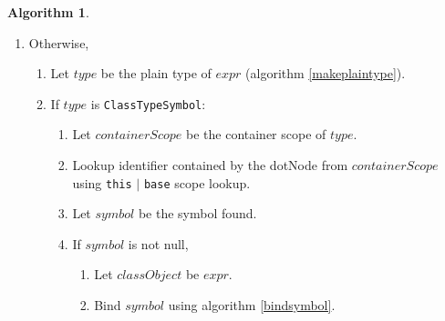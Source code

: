 \documentclass[a4paper,oneside,11pt]{book}
\theoremstyle{definition}
\newtheorem{algo}{Algorithm}[section]
\begin{document}
\begin{algo}
\begin{itemize}
\begin{enumerate}
\begin{enumerate}
\item
Let $containerSymbol$ be null.
\item
If $expr$ is \verb|BoundNamespaceExpression| set $containerSymbol$ to the namespace symbol contained by $expr$.
\item
Otherwise, $expr$ is \verb|BoundTypeExpression|, so
\begin{enumerate}
\item
Let $typeSymbol$ be the type symbol contained by $expr$.
\item
If $typeSymbol$ is \verb|ClassTypeSymbol| or $typeSymbol$ is \verb|EnumTypeSymbol|, set $containerSymbol$ to $typeSymbol$.
\item
Otherwise, report error.
\end{enumerate}
\item
Let $containerScope$ be the container scope of $containerSymbol$.
\item
Lookup identifier contained by the dotNode from $containerScope$ using \verb|this| $|$ \verb|base| scope lookup.
\item
Let $symbol$ be the symbol found.
\item
If $symbol$ is not null,
\begin{enumerate}
\item
Bind $symbol$ using algorithm \ref{bindsymbol}.
\end{enumerate}
\item
Otherwise, report error.
\end{enumerate}
\item
Otherwise,
\begin{enumerate}
\item
Let $type$ be the plain type of $expr$ (algorithm \ref{makeplaintype}).
\item
If $type$ is \verb|ClassTypeSymbol|:
\begin{enumerate}
\item
Let $containerScope$ be the container scope of $type$.
\item
Lookup identifier contained by the dotNode from $containerScope$ using \verb|this| $|$ \verb|base| scope lookup.
\item
Let $symbol$ be the symbol found.
\item
If $symbol$ is not null,
\begin{enumerate}
\item
Let $classObject$ be $expr$.
\item
Bind $symbol$ using algorithm \ref{bindsymbol}.

\end{enumerate}
\end{enumerate}
\end{enumerate}
\end{enumerate}
\end{itemize}
\end{algo}
\end{document}
